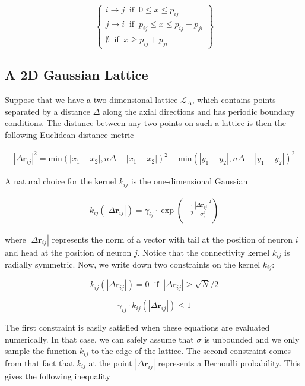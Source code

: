 \documentclass{ucetd}
\begin{document}
  \[
    \left\{\begin{array}{lr}
        i\rightarrow j \;\;\mathrm{if}\;\; 0 \leq x \leq p_{ij}\\
        j\rightarrow i \;\;\mathrm{if}\;\; p_{ij} \leq x \leq p_{ij}+p_{ji}\\
        \emptyset \;\; \mathrm{if} \;\; x \geq p_{ij}+p_{ji}
        \end{array}\right\}
  \]


\subsection{A 2D Gaussian Lattice}

Suppose that we have a two-dimensional lattice $\mathcal{L}_{\Delta}$, which contains points separated by a distance $\Delta$ along the axial directions and has periodic boundary conditions. The distance between any two points on such a lattice is then the following Euclidean distance metric

\begin{align*}
|\Delta\mathbf{r}_{ij}|^{2} = \mathrm{min}(|x_1 - x_2|, n\Delta - |x_1 - x_2|)^2 + \mathrm{min}(|y_1 - y_2|, n\Delta - |y_1 - y_2|)^2
\end{align*}

A natural choice for the kernel $k_{ij}$ is the one-dimensional Gaussian

\begin{align*}
k_{ij}(|\Delta\mathbf{r}_{ij}|) = \gamma_{ij}\cdot \exp\left(-\frac{1}{2}\frac{|\Delta\mathbf{r}_{ij}|^{2}}{\sigma_{i}^{2}} \right)
\end{align*}

where $|\Delta\mathbf{r}_{ij}|$ represents the norm of a vector with tail at the position of neuron $i$ and head at the position of neuron $j$. Notice that the connectivity kernel $k_{ij}$ is radially symmetric. Now, we write down two constraints on the kernel $k_{ij}$: 

\begin{equation}
k_{ij}(|\Delta\mathbf{r}_{ij}|) = 0 \;\; \mathrm{if} \;\; |\Delta\mathbf{r}_{ij}| \geq \sqrt{N}/2
\end{equation}


\begin{equation}
\gamma_{ij}\cdot k_{ij}(|\Delta\mathbf{r}_{ij}|) \leq 1
\end{equation}


The first constraint is easily satisfied when these equations are evaluated numerically. In that case, we can safely assume that $\sigma$ is unbounded and we only sample the function $k_{ij}$ to the edge of the lattice. The second constraint comes from that fact that $k_{ij}$ at the point $|\Delta\mathbf{r}_{ij}|$ represents a Bernoulli probability. This gives the following inequality
\end{document}
